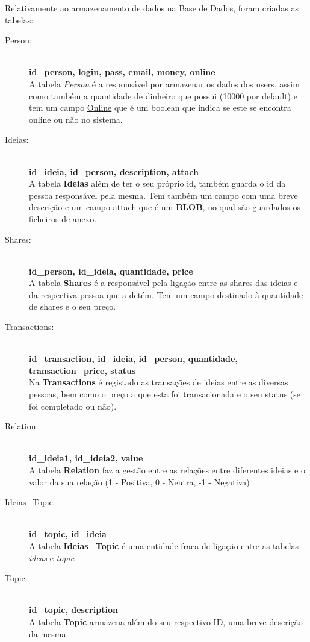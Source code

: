 \documentclass[12pt]{article} %
\begin{document}
Relativamente ao armazenamento de dados na Base de Dados, foram criadas as tabelas:
\begin{description}
	\item[Person:] \hfill \\
	\textbf{id\_person, login, pass, email, money, online}\\
	A tabela \emph{Person} é a responsável por armazenar os dados dos users, assim como também a quantidade de dinheiro que possui (10000 por default) e tem um campo \underline{Online} que é um boolean que indica se este se encontra online ou não no sistema.
	
	\item[Ideias:] \hfill \\
	\textbf{id\_ideia, id\_person, description, attach}\\
	A tabela \textbf{Ideias} além de ter o seu próprio id, também guarda o id da pessoa responsável pela mesma. Tem também um campo com uma breve descrição e um campo attach que é um \textbf{BLOB}, no qual são guardados os ficheiros de anexo.
	\item[Shares:] \hfill \\
	\textbf{id\_person, id\_ideia, quantidade, price}\\
	A tabela \textbf{Shares} é a responsável pela ligação entre as shares das ideias e da respectiva pessoa que a detém. Tem um campo destinado à quantidade de shares e o seu preço.
	\item[Transactions:] \hfill \\
	\textbf{id\_transaction, id\_ideia, id\_person,	quantidade, transaction\_price, status}\\
	Na \textbf{Transactions} é registado as transações de ideias entre as diversas pessoas, bem como o preço a que esta foi transacionada e o seu status (se foi completado ou não).
	\item[Relation:] \hfill \\
	\textbf{id\_ideia1, id\_ideia2, value}\\
	A tabela \textbf{Relation} faz a gestão entre as relações entre diferentes ideias e o valor da sua relação (1 - Positiva, 0 - Neutra, -1 - Negativa)
	\item[Ideias\_Topic:] \hfill \\
	\textbf{id\_topic, id\_ideia}\\
	A tabela \textbf{Ideias\_Topic} é uma entidade fraca de ligação entre as tabelas \emph{ideas} e \emph{topic}
	\item[Topic:] \hfill \\
	\textbf{id\_topic, description}\\
	A tabela \textbf{Topic} armazena além do seu respectivo ID, uma breve descrição da mesma.
\end{description}
\end{document}
